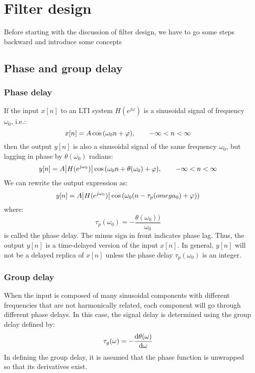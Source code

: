 \documentclass[../../main/main.tex]{subfiles}
\begin{document}
\chapter{Filter design}

Before starting with the discussion of filter design, we have to go some steps backward and introduce some concepts

\section{Phase and group delay}



\subsection{Phase delay}
If the input \( x[n] \) to an LTI system \( H(e^{j\omega}) \) is a sinusoidal signal of frequency \( \omega_{0} \), i.e.:
\begin{equation}
    x[n]
    =
    A\cos\qty(\omega_{0}n + \varphi),
    \qquad
    - \infty < n < \infty
    \label{eq:L17_S18_1}
\end{equation}
then the output \( y[n] \) is also a sinusoidal signal of the same frequency \( \omega_{0} \), but lagging in phase by \( \theta(\omega_{0}) \) radians:
\begin{equation}
    y[n]
    =
    A \abs{H(e^{j\omega_{0}})} \cos\qty(\omega_{0}n + \theta(\omega_{0}) + \varphi),
    \qquad
    - \infty < n < \infty
    \label{eq:L17_S18_2}
\end{equation}
We can rewrite the output expression as:
\begin{equation}
    y[n]
    =
    A \abs{H(e^{j\omega_{0}})} \cos\qty(\omega_{0}(n-\tau_{p}(omega_{0}) + \varphi))
    \label{eq:L17_S19_1}
\end{equation}
where:
\begin{equation}
    \tau_{p}(\omega_{0})
    =
    - \frac{\theta(\omega_{0}))}{\omega_{0}}
    \label{eq:L17_S19_2}
\end{equation}
is called the phase delay. The minus sign in front indicates phase lag. Thus, the output \( y[n] \) is a time-delayed version of the input \( x[n] \). In general, \( y[n] \) will not be a delayed replica of \( x[n] \) unless the phase delay \( \tau_{p}(\omega_{0}) \) is an integer.



\subsection{Group delay}
When the input is composed of many sinusoidal components with different frequencies that are not harmonically related, each component will go through different phase delays. In this case, the signal delay is determined using the group delay defined by:
\begin{equation}
    \tau_{g}(\omega)
    =
    - \dv{\theta(\omega)}{\omega}
    \label{eq:L17_S21_1}
\end{equation}
In defining the group delay, it is assumed that the phase function is unwrapped so that its derivatives exist.
\end{document}

